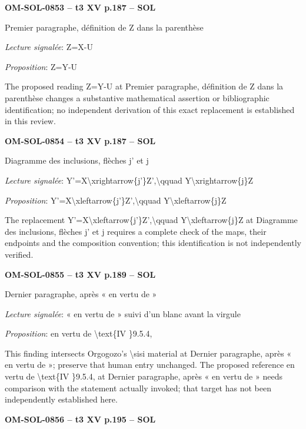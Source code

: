 \par\noindent\textbf{OM-SOL-0853 -- t3 XV p.187 -- SOL}\par
Premier paragraphe, définition de Z dans la parenthèse\par
\emph{Lecture signalée}: Z=\allowbreak X-U\par
\emph{Proposition}: Z=\allowbreak Y-U\par
The proposed reading Z=\allowbreak Y-U at Premier paragraphe, définition de Z dans la parenthèse changes a substantive mathematical assertion or bibliographic identification; no independent derivation of this exact replacement is established in this review.\par
\par\noindent\textbf{OM-SOL-0854 -- t3 XV p.187 -- SOL}\par
Diagramme des inclusions, flèches j' et j\par
\emph{Lecture signalée}: Y'=\allowbreak X\textbackslash{}xrightarrow\{j'\}Z',\textbackslash{}qquad Y\textbackslash{}xrightarrow\{j\}Z\par
\emph{Proposition}: Y'=\allowbreak X\textbackslash{}xleftarrow\{j'\}Z',\textbackslash{}qquad Y\textbackslash{}xleftarrow\{j\}Z\par
The replacement Y'=\allowbreak X\textbackslash{}xleftarrow\{j'\}Z',\textbackslash{}qquad Y\textbackslash{}xleftarrow\{j\}Z at Diagramme des inclusions, flèches j' et j requires a complete check of the maps, their endpoints and the composition convention; this identification is not independently verified.\par
\par\noindent\textbf{OM-SOL-0855 -- t3 XV p.189 -- SOL}\par
Dernier paragraphe, après « en vertu de »\par
\emph{Lecture signalée}: « en vertu de » suivi d'un blanc avant la virgule\par
\emph{Proposition}: en vertu de \textbackslash{}text\{IV \}9.5.4,\par
This finding intersects Orgogozo's \textbackslash{}sisi material at Dernier paragraphe, après « en vertu de »; preserve that human entry unchanged. The proposed reference en vertu de \textbackslash{}text\{IV \}9.5.4, at Dernier paragraphe, après « en vertu de » needs comparison with the statement actually invoked; that target has not been independently established here.\par
\par\noindent\textbf{OM-SOL-0856 -- t3 XV p.195 -- SOL}\par
